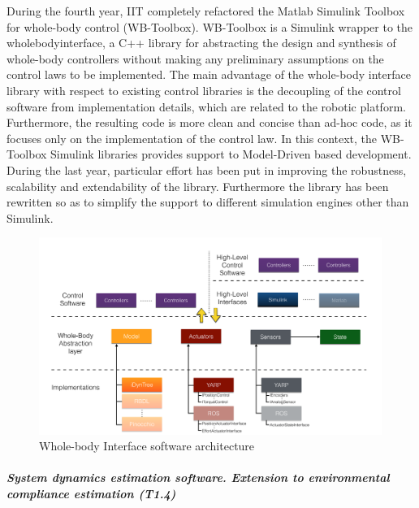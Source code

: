 During the fourth year, IIT completely refactored the Matlab Simulink Toolbox
for whole-body control (WB-Toolbox).  WB-Toolbox is a Simulink wrapper to the
wholebodyinterface, a C++ library for abstracting the design and synthesis of
whole-body controllers without making any preliminary assumptions on the
control laws to be implemented.  The main advantage of the whole-body
interface library with respect to existing control libraries is the decoupling
of the control software from implementation details, which are related to the
robotic platform.  Furthermore, the resulting code is more clean and concise
than ad-hoc code, as it focuses only on the implementation of the control law.
In this context, the WB-Toolbox Simulink libraries provides support to
Model-Driven based development.  During the last year, particular effort has
been put in improving the robustness, scalability and extendability of the
library.  Furthermore the library has been rewritten so as to simplify the
support to different simulation engines other than Simulink.
%
\begin{figure} 
    \centering
    \includegraphics[width=.9\textwidth]{images/WBI_diagram.pdf}
  \caption{Whole-body Interface software architecture}
  \label{fig:images_WBI_diagram}
\end{figure}
%



\subparagraph*{System dynamics estimation software. Extension to
environmental compliance estimation (T1.4)}

